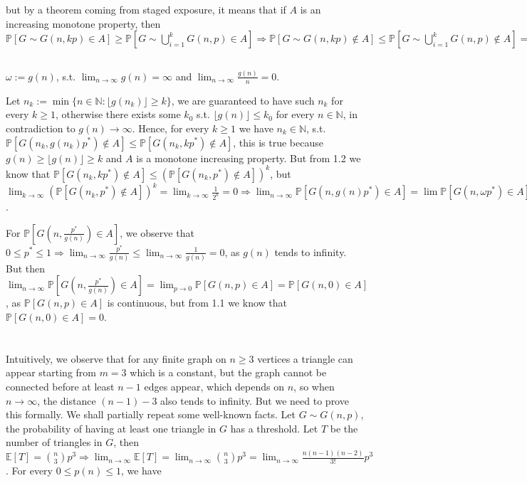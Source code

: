 \documentclass{article}
\begin{document}
but by a theorem coming from staged exposure, it means that if $A$ is an increasing monotone property, then $\mathbb{P}[G\sim{G(n,kp)}\in{A}]\geq{\mathbb{P}[G\sim\bigcup_{i=1}^{k}G(n,p)\in{A}]}\Rightarrow{\mathbb{P}[G\sim{G(n,kp)}\notin{A}]\leq{\mathbb{P}[G\sim\bigcup_{i=1}^{k}G(n,p)\notin{A}]}=(\mathbb{P}[G\sim{G(n,p)}\notin{A}]})^k$

\subsection{}
$\omega:=g(n)$, s.t. $\lim_{n\rightarrow\infty}g(n)=\infty$ and $\lim_{n\rightarrow\infty}\frac{g(n)}{n}=0$.

Let $n_k:=\min\{n\in\mathbb{N} : \lfloor{g(n_k)}\rfloor\geq{k}\}$, we are guaranteed to have such $n_k$ for every $k\geq{1}$, otherwise there exists some $k_0$ s.t. $\lfloor{g(n)}\rfloor\leq{k_0}$ for every $n\in\mathbb{N}$, in contradiction to $g(n)\rightarrow\infty$. 
Hence, for every $k\geq{1}$ we have $n_k\in\mathbb{N}$, s.t. $\mathbb{P}[G(n_k,g(n_k)p^{\ast})\notin{A}]\leq{\mathbb{P}[G(n_k,kp^{\ast})\notin{A}]}$, this is true because $g(n)\geq\lfloor{g(n)}\rfloor\geq{k}$ and $A$ is a monotone increasing property. But from 1.2 we know that $\mathbb{P}[G(n_k,kp^{\ast})\notin{A}]\leq{(\mathbb{P}[G(n_k,p^{\ast})\notin{A}])^k}$, but $\lim_{k\rightarrow\infty}(\mathbb{P}[G(n_k,p^{\ast})\notin{A}])^k=\lim_{k\rightarrow\infty}\frac{1}{2^k}=0\Rightarrow{\lim_{n\rightarrow\infty}\mathbb{P}[G(n,g(n){p^{\ast}})\in{A}]}=\lim\mathbb{P}[G(n,\omega{p^{\ast}})\in{A}]=1$.

For $\mathbb{P}[G(n,\frac{p^{\ast}}{g(n)})\in{A}]$, we observe that $0\leq{p^{\ast}}\leq{1}\Rightarrow{\lim_{n\rightarrow\infty}\frac{p^{\ast}}{g(n)}}\leq{\lim_{n\rightarrow\infty}\frac{1}{g(n)}}=0$, as $g(n)$ tends to infinity.
But then $\lim_{n\rightarrow\infty}\mathbb{P}[G(n,\frac{p^{\ast}}{g(n)})\in{A}]=\lim_{p\rightarrow{0}}\mathbb{P}[G(n,p)\in{A}]=\mathbb{P}[G(n,0)\in{A}]$, as $\mathbb{P}[G(n,p)\in{A}]$ is continuous, but from 1.1 we know that $\mathbb{P}[G(n,0)\in{A}]=0$.

\section{}
Intuitively, we observe that for any finite graph on $n\geq{3}$ vertices a triangle can appear starting from $m=3$ which is a constant, but the graph cannot be connected before at least $n-1$ edges appear, which depends on $n$, so when $n\rightarrow\infty$, the distance $(n-1)-3$ also tends to infinity. But we need to prove this formally.
We shall partially repeat some well-known facts. Let $G\sim{G(n,p)}$, the probability of having at least one triangle in $G$ has a threshold. Let $T$ be the number of triangles in $G$, then $\mathbb{E}[T]=\binom{n}{3}p^3\Rightarrow{\lim_{n\rightarrow\infty}}\mathbb{E}[T]=\lim_{n\rightarrow\infty}\binom{n}{3}p^3=\lim_{n\rightarrow\infty}\frac{n(n-1)(n-2)}{3!}p^3$. For every $0\leq{p(n)}\leq{1}$, we have 
\end{document}
